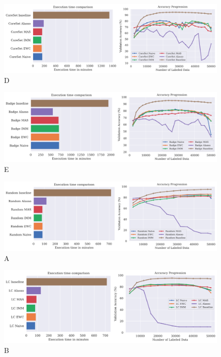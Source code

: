 \begin{figure} [ht]
    \centering
    \includegraphics[width=\linewidth]{images/results_CAL/CoreSet_CAL_2000b.png}
    \caption[Continual Active Learning CoreSet 2000 batch size]{D}
    \label{fig:Evaluation:Results:CAL:CoreSet2000}
\end{figure}

\begin{figure} [ht]
    \centering
    \includegraphics[width=\linewidth]{images/results_CAL/Badge_CAL_2000b.png}
    \caption[Continual Active Learning Badge 2000 batch size]{E}
    \label{fig:Evaluation:Results:CAL:Badge2000}
\end{figure}





\begin{figure} [ht]
    \centering
    \includegraphics[width=\linewidth]{images/results_CAL/Random_CAL_4000b.png}
    \caption[Continual Active Learning Random 4000 batch size]{A}
    \label{fig:Evaluation:Results:CAL:Random4000}
\end{figure}

\begin{figure} [ht]
    \centering
    \includegraphics[width=\linewidth]{images/results_CAL/LC_CAL_4000b.png}
    \caption[Continual Active Learning Random 4000 batch size]{B}
    \label{fig:Evaluation:Results:CAL:LC4000}
\end{figure}

